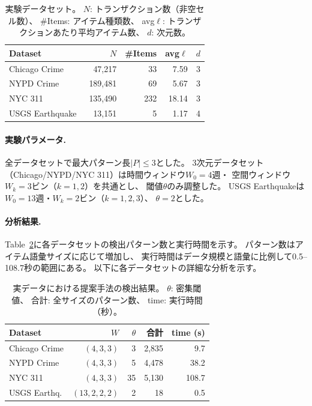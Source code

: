 \begin{table}[h]
\centering
\caption{実験データセット。
$N$: トランザクション数（非空セル数）、
\#Items: アイテム種類数、
avg$\ell$: トランザクションあたり平均アイテム数、
$d$: 次元数。}
\label{tab:datasets}
\small
\begin{tabular}{lrrrr}
\toprule
Dataset & $N$ & \#Items & avg$\ell$ & $d$ \\
\midrule
Chicago Crime~\cite{chicagocrime}  &  47,217 &  33 &  7.59 & 3 \\
NYPD Crime~\cite{nypdcrime}        & 189,481 &  69 &  5.67 & 3 \\
NYC 311~\cite{nyc311}              & 135,490 & 232 & 18.14 & 3 \\
USGS Earthquake~\cite{usgseq}      &  13,151 &   5 &  1.17 & 4 \\
\bottomrule
\end{tabular}
\end{table}

\paragraph{実験パラメータ.}
全データセットで最大パターン長$|P| \leq 3$とした。
3次元データセット（Chicago/NYPD/NYC 311）は時間ウィンドウ$W_0 = 4$週・
空間ウィンドウ$W_k = 3$ビン（$k = 1, 2$）を共通とし、
閾値$\theta$のみ調整した。
USGS Earthquakeは$W_0 = 13$週・$W_k = 2$ビン（$k = 1,2,3$）、
$\theta = 2$とした。

\paragraph{分析結果.}
Table~\ref{tab:realdata_npatterns}に各データセットの検出パターン数と実行時間を示す。
パターン数はアイテム語彙サイズに応じて増加し、
実行時間はデータ規模と語彙に比例して0.5--108.7秒の範囲にある。
以下に各データセットの詳細な分析を示す。

\begin{table}[h]
\centering
\caption{実データにおける提案手法の検出結果。
  $\theta$: 密集閾値、
  合計: 全サイズのパターン数、
  time: 実行時間（秒）。}
\label{tab:realdata_npatterns}
\small
\begin{tabular}{lrrrr}
\toprule
Dataset & $W$ & $\theta$ & 合計 & time (s) \\
\midrule
Chicago Crime  & $(4,3,3)$    &   3 & 2,835 &   9.7 \\
NYPD Crime     & $(4,3,3)$    &   5 & 4,478 &  38.2 \\
NYC 311        & $(4,3,3)$    &  35 & 5,130 & 108.7 \\
USGS Earthq.   & $(13,2,2,2)$ &   2 &    18 &   0.5 \\
\bottomrule
\end{tabular}
\end{table}


